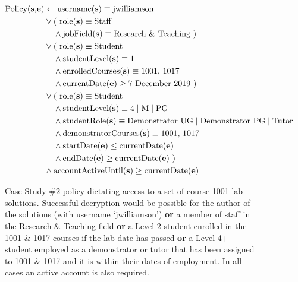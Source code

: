 \begin{figure}[ht]
  \centering
\begin{align*}
  \text{Policy(\textbf{s},\textbf{e})}
  &
    \leftarrow
    \text{username(\textbf{s})} \equiv \text{jwilliamson}
  \\
  &
    \vee
    \text{( role(\textbf{s})} \equiv \text{Staff}
  \\
  &
    \phantom{::}\phantom{::}\wedge
    \text{jobField(\textbf{s})} \equiv \text{Research \& Teaching )}
  \\
  &
    \vee
    \text{( role(\textbf{s})} \equiv \text{Student}
  \\
  &
    \phantom{::}\phantom{::}\wedge
    \text{studentLevel(\textbf{s})} \equiv \text{1}
  \\
  &
    \phantom{::}\phantom{::}\wedge
    \text{enrolledCourses(\textbf{s})} \equiv \text{1001, 1017}
  \\
  &
    \phantom{::}\phantom{::}\wedge
    \text{currentDate(\textbf{e})} \geq \text{7 December 2019 )}
  \\
  &
    \vee
    \text{( role(\textbf{s})} \equiv \text{Student}
  \\
  &
    \phantom{::}\phantom{::}\wedge
    \text{studentLevel(\textbf{s})} \equiv \text{4} \mid \text{M} \mid \text{PG}
  \\
  &
    \phantom{::}\phantom{::}\wedge
    \text{studentRole(\textbf{s})} \equiv \text{Demonstrator UG} \mid \text{Demonstrator PG} \mid \text{Tutor}
  \\
  &
    \phantom{::}\phantom{::}\wedge
    \text{demonstratorCourses(\textbf{s})} \equiv \text{1001, 1017}
  \\
  &
    \phantom{::}\phantom{::}\wedge
    \text{startDate(\textbf{e})} \leq \text{currentDate(\textbf{e})}
  \\
  &
    \phantom{::}\phantom{::}\wedge
    \text{endDate(\textbf{e})} \geq \text{currentDate(\textbf{e}) )}
  \\
  &
    \wedge
    \text{accountActiveUntil(\textbf{s})} \geq \text{currentDate(\textbf{e})}
\end{align*}
  \caption{
    \label{fig:case_study_policy_2}
    Case Study \#2 policy dictating access to a set of course 1001 lab solutions.
    Successful decryption would be possible for the author of the solutions (with username `jwilliamson') \textbf{or} a member of staff in the Research \& Teaching field \textbf{or} a Level 2 student enrolled in the 1001 \& 1017 courses if the lab date has passed \textbf{or} a Level 4+ student employed as a demonstrator or tutor that has been assigned to 1001 \& 1017 and it is within their dates of employment. In all cases an active account is also required.
  }
\end{figure}

